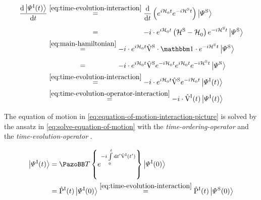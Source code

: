 \begin{equation}
    \label{eq:equation-of-motion-interaction-picture}
    \begin{split}
        \difft{\ketpsiof[\interactionPicture]{t}} &\stackrel{\ref{eq:time-evolution-interaction}}{=}
        \difft{} \left(e^{i \HzeroHamiltonian{} t} e^{-i \pictureHamiltonian[\schroedingerPicture]{} t} \right)\ketpsi[\schroedingerPicture]{} \\
        &\stackrel{\phantom{\ref{eq:time-evolution-interaction}}}{=} -i \cdot e^{i \HzeroHamiltonian{} t}\left( \pictureHamiltonian[\schroedingerPicture]{} - \HzeroHamiltonian{} \right) e^{-i \pictureHamiltonian[\schroedingerPicture]{} t} \ketpsi[\schroedingerPicture]{}\\
        &\stackrel{\ref{eq:main-hamiltonian}}{=} -i \cdot e^{i \HzeroHamiltonian{} t} \Vhamiltonian[\schroedingerPicture] \cdot \one \cdot e^{-i \pictureHamiltonian[\schroedingerPicture]{} t} \ketpsi[\schroedingerPicture]{}\\
        &\stackrel{\phantom{\ref{eq:main-hamiltonian}}}{=} -i \cdot e^{i \HzeroHamiltonian{} t} \Vhamiltonian[\schroedingerPicture] e^{-i \HzeroHamiltonian{} t}e^{i \HzeroHamiltonian{} t} e^{-i \pictureHamiltonian[\schroedingerPicture]{} t} \ketpsi[\schroedingerPicture]{}\\
        &\stackrel{\ref{eq:time-evolution-interaction}}{=} -i \cdot e^{i \HzeroHamiltonian{} t} \Vhamiltonian[\schroedingerPicture] e^{-i \HzeroHamiltonian{} t}\ketpsiof[\interactionPicture]{t}\\
        &\stackrel{\ref{eq:time-evolution-operator-interaction}}{=} -i \cdot \VhamiltonianOfT[\interactionPicture] \ketpsiof[\interactionPicture]{t}
    \end{split}
\end{equation}

The equation of motion in \autoref{eq:equation-of-motion-interaction-picture} is solved by the ansatz in \autoref{eq:solve-equation-of-motion} with the  \emph{time-ordering-operator} \timeOrderingOperator and the \emph{time-evolution-operator} \timeEvolutionOperator[\interactionPicture].

\begin{equation}
    \label{eq:solve-equation-of-motion}
    \begin{split}
        \ketpsiof[\interactionPicture]{t} &= \timeOrderingOperator \left\lbrace e^{-i\int\limits_0^t \text{d} t' \VhamiltonianOf[\interactionPicture]{t'}}\right\rbrace \ketpsiof[\interactionPicture]{0}\\
        &= \timeEvolutionOperator[\interactionPicture] \ketpsiof[\interactionPicture]{0} \stackrel{\ref{eq:time-evolution-interaction}}{=} \timeEvolutionOperator[\interactionPicture] \ketpsiof[\schroedingerPicture]{0}
    \end{split}
\end{equation}

